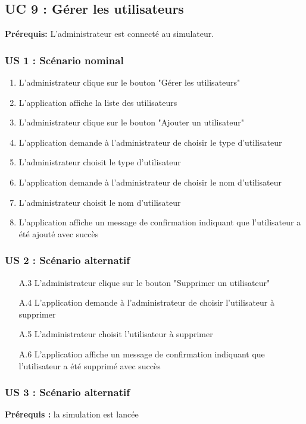 \documentclass{scrartcl}
\begin{document}
\subsection{UC 9 : Gérer les utilisateurs}
\textbf{Prérequis:} L'administrateur est connecté au simulateur.

\subsubsection*{US 1 : Scénario nominal}
\begin{enumerate}
    \item L'administrateur clique sur le bouton "Gérer les utilisateurs"
    \item L'application affiche la liste des utilisateurs
    \item L'administrateur clique sur le bouton "Ajouter un utilisateur"
    \item L'application demande à l'administrateur de choisir le type d'utilisateur
    \item L'administrateur choisit le type d'utilisateur
    \item L'application demande à l'administrateur de choisir le nom d'utilisateur
    \item L'administrateur choisit le nom d'utilisateur
    \item L'application affiche un message de confirmation indiquant que l'utilisateur a été ajouté avec succès
\end{enumerate}

\subsubsection*{US 2 : Scénario alternatif}
\begin{enumerate}
    \item[A.3] L'administrateur clique sur le bouton "Supprimer un utilisateur"
    \item[A.4] L'application demande à l'administrateur de choisir l'utilisateur à supprimer
    \item[A.5] L'administrateur choisit l'utilisateur à supprimer
    \item[A.6] L'application affiche un message de confirmation indiquant que l'utilisateur a été supprimé avec succès
\end{enumerate}

\subsubsection*{US 3 : Scénario alternatif}
\textbf{Prérequis :} la simulation est lancée
\end{document}

